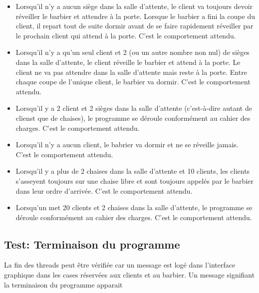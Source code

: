 \documentclass{article}
\begin{document}
\begin{itemize}
    \item Lorsqu'il n'y a aucun siège dans la salle d'attente, le client va toujours devoir réveiller le barbier et attendre à la porte.
    Lorsque le barbier a fini la coupe du client, il repart tout de suite dormir avant de se faire rapidement réveiller par le prochain
    client qui attend à la porte. C'est le comportement attendu. 
    \item Lorsqu'il n'y a qu'un seul client et 2 (ou un autre nombre non nul) de sièges dans la salle d'attente, le client réveille
    le barbier et attend à la porte. Le client ne va pas attendre dans la salle d'attente mais reste à la porte. Entre chaque coupe de 
    l'unique client, le barbier va dormir. C'est le comportement attendu.
    \item Lorsqu'il y a 2 client et 2 sièges dans la salle d'attente (c'est-à-dire autant de clienst que de chaises), le programme se 
    déroule conformément au cahier des charges. C'est le comportement attendu.
    \item Lorsqu'il n'y a aucun client, le babrier va dormir et ne se réveille jamais. C'est le comportement attendu. 
    \item Lorsqu'il y a plus de 2 chaises dans la salle d'attente et 10 clients, les clients s'asseyent toujours sur une chaise libre et 
    sont toujours appelés par le barbier dans leur ordre d'arrivée. C'est le comportement attendu.
    \item Lorsqu'un met 20 clients et 2 chaises dans la salle d'attente, le programme se déroule conformément au cahier des charges.
    C'est le comportement attendu.
\end{itemize}

\subsection*{Test: Terminaison du programme}

La fin des threads peut être vérifiée car un message est logé dans l'interface graphique dans les cases réservées aux clients et au barbier. 
Un message signifiant la terminaison du programme apparait 
\end{document}

